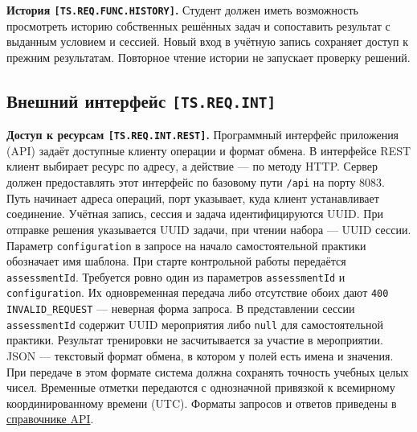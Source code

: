 \documentclass[12pt,a4paper]{article}
\begin{document}
\hypertarget{ts-req-func-history}{} \textbf{История \texttt{[TS.\allowbreak{}REQ.\allowbreak{}FUNC.\allowbreak{}HISTORY]}.} Студент должен иметь возможность просмотреть историю собственных решённых задач и сопоставить результат с выданным условием и сессией. Новый вход в учётную запись сохраняет доступ к прежним результатам. Повторное чтение истории не запускает проверку решений.

\subsection{\texorpdfstring{Внешний интерфейс \texttt{[TS.\allowbreak{}REQ.\allowbreak{}INT]}}{Внешний интерфейс }}\label{32-ux432ux43dux435ux448ux43dux438ux439-ux438ux43dux442ux435ux440ux444ux435ux439ux441-tsreqint}

\hypertarget{32-внешний-интерфейс-tsreqint}{}

\hypertarget{ts-req-int}{}

\hypertarget{ts-req-int-rest}{} \textbf{Доступ к ресурсам \texttt{[TS.\allowbreak{}REQ.\allowbreak{}INT.\allowbreak{}REST]}.} Программный интерфейс приложения (API) задаёт доступные клиенту операции и формат обмена. В интерфейсе REST клиент выбирает ресурс по адресу, а действие --- по методу HTTP. Сервер должен предоставлять этот интерфейс по базовому пути \texttt{/api} на порту 8083. Путь начинает адреса операций, порт указывает, куда клиент устанавливает соединение. Учётная запись, сессия и задача идентифицируются UUID. При отправке решения указывается UUID задачи, при чтении набора --- UUID сессии. Параметр \texttt{configuration} в запросе на начало самостоятельной практики обозначает имя шаблона. При старте контрольной работы передаётся \texttt{assessmentId}. Требуется ровно один из параметров \texttt{assessmentId} и \texttt{configuration}. Их одновременная передача либо отсутствие обоих дают \texttt{400 INVALID\_\allowbreak{}REQUEST} --- неверная форма запроса. В представлении сессии \texttt{assessmentId} содержит UUID мероприятия либо \texttt{null} для самостоятельной практики. Результат тренировки не засчитывается за участие в мероприятии. JSON --- текстовый формат обмена, в котором у полей есть имена и значения. При передаче в этом формате система должна сохранять точность учебных целых чисел. Временные отметки передаются с однозначной привязкой к всемирному координированному времени (UTC). Форматы запросов и ответов приведены в {\href{../09\_Архитектура\_и\_API/DOC-08\_Справочник\_API.pdf\#doc-08-справочник-api-сессии-задач}{справочнике API}}.
\end{document}
